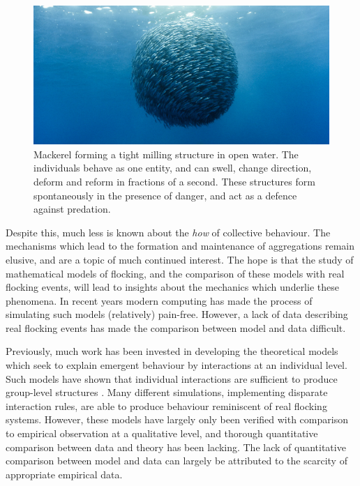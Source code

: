 \begin{figure}[tb]
    \includegraphics[width=\textwidth]{milling.jpg}
    \caption{Mackerel forming a tight milling structure in open water. The
        individuals behave as one entity, and can swell, change direction,
        deform and reform in fractions of a second. These structures form
        spontaneously in the presence of danger, and act as a defence against
        predation.}
    \label{fig:milling}
\end{figure}

Despite this, much less is known about the \emph{how} of collective behaviour.
The mechanisms which lead to the formation and maintenance of aggregations
remain elusive, and are a topic of much continued interest. The hope is that
the study of mathematical models of flocking, and the comparison of these
models with real flocking events, will lead to insights about the mechanics
which underlie these phenomena. In recent years modern computing has made the
process of simulating such models (relatively) pain-free. However, a lack of
data describing real flocking events has made the comparison between model and
data difficult.

Previously, much work has been invested in developing the theoretical models
which seek to explain emergent behaviour by interactions at an individual
level. Such models have shown that individual interactions are sufficient to
produce group-level structures \parencite{aoki82}. Many different simulations,
implementing disparate interaction rules, are able to produce behaviour
reminiscent of real flocking systems. However, these models have largely only
been verified with comparison to empirical observation at a qualitative level,
and thorough quantitative comparison between data and theory has been lacking.
The lack of quantitative comparison between model and data can largely be
attributed to the scarcity of appropriate empirical data.


